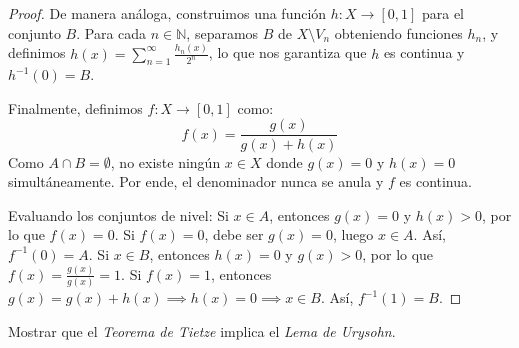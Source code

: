 \documentclass{article}
\theoremstyle{plain}
\theoremstyle{definition}
\newcommand{\N}{\mathbb{N}}
\newenvironment{ejercicio}[1]{\begin{trivlist}
\item[\hskip \labelsep {\bfseries Ejercicio}\hskip \labelsep {\bfseries #1.}]}{\end{trivlist}}
\begin{document}
\begin{proof}
    De manera análoga, construimos una función \( h : X \to [0, 1] \) para el conjunto \( B \). Para cada \( n \in \N \), separamos \( B \) de \( X \setminus V_n \) obteniendo funciones \( h_n \), y definimos \( h(x) = \sum_{n=1}^{\infty} \frac{h_n(x)}{2^n} \), lo que nos garantiza que \( h \) es continua y \( h^{-1}(0) = B \).

    Finalmente, definimos \( f : X \to [0,1] \) como:
    \[
        f(x) = \frac{g(x)}{g(x) + h(x)}
    \]
    Como \( A \cap B = \emptyset \), no existe ningún \( x \in X \) donde \( g(x) = 0 \) y \( h(x) = 0 \) simultáneamente. Por ende, el denominador nunca se anula y \( f \) es continua.

    Evaluando los conjuntos de nivel:
    Si \( x \in A \), entonces \( g(x) = 0 \) y \( h(x) > 0 \), por lo que \( f(x) = 0 \). Si \( f(x) = 0 \), debe ser \( g(x) = 0 \), luego \( x \in A \). Así, \( f^{-1}(0) = A \).
    Si \( x \in B \), entonces \( h(x) = 0 \) y \( g(x) > 0 \), por lo que \( f(x) = \frac{g(x)}{g(x)} = 1 \). Si \( f(x) = 1 \), entonces \( g(x) = g(x) + h(x) \implies h(x) = 0 \implies x \in B \). Así, \( f^{-1}(1) = B \).
\end{proof}

\begin{ejercicio}{7}
    Mostrar que el \emph{Teorema de Tietze} implica el \emph{Lema de Urysohn}.
\end{ejercicio}
\end{document}
